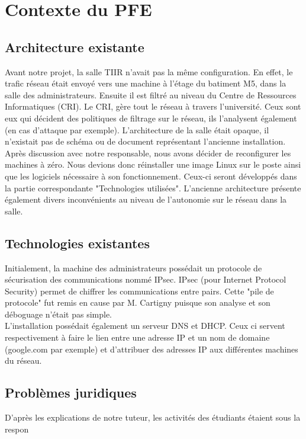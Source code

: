 \chapter{Contexte du PFE}
\label{chap:premierchapitre}

\section{Architecture existante}
Avant notre projet, la salle TIIR n'avait pas la même configuration. En effet, le trafic réseau était envoyé vers une machine à l'étage du batiment M5, dans la salle des administrateurs. Ensuite il est filtré au niveau du Centre de Ressources Informatiques (CRI). Le CRI, gère tout le réseau à travers l'université. Ceux sont eux qui décident des politiques de filtrage sur le réseau, ils l'analysent également (en cas d'attaque par exemple). L'architecture de la salle était opaque, il n'existait pas de schéma ou de document représentant l'ancienne installation. Après discussion avec notre responsable, nous avons décider de reconfigurer les machines à zéro. Nous devions donc réinstaller une image Linux sur le poste ainsi que les logiciels nécessaire à son fonctionnement. Ceux-ci seront développés dans la partie correspondante "Technologies utilisées". L'ancienne architecture présente également divers inconvénients au niveau de l'autonomie sur le réseau dans la salle. 

\section{Technologies existantes}
Initialement, la machine des administrateurs possédait un protocole de sécurisation des communications nommé IPsec. IPsec (pour Internet Protocol Security) permet de chiffrer les communications entre pairs. Cette "pile de protocole" fut remis en cause par M. Cartigny puisque son analyse et son déboguage n'était pas simple.\\
L'installation possédait également un serveur DNS et DHCP. Ceux ci servent respectivement à faire le lien entre une adresse IP et un nom de domaine (google.com par exemple) et d'attribuer des adresses IP aux différentes machines du réseau.\\

\section{Problèmes juridiques}
D'après les explications de notre tuteur, les activités des étudiants étaient sous la respon
